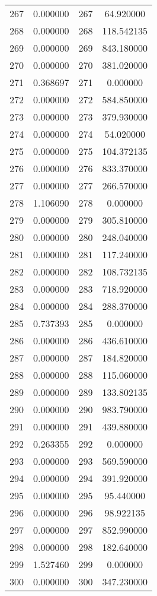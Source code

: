 \documentclass[12pt]{article}
\begin{document}
\begin{longtable}{@{}cccc@{}}
267 & 0.000000 & 267 & 64.920000 \\
268 & 0.000000 & 268 & 118.542135 \\
269 & 0.000000 & 269 & 843.180000 \\
270 & 0.000000 & 270 & 381.020000 \\
271 & 0.368697 & 271 & 0.000000 \\
272 & 0.000000 & 272 & 584.850000 \\
273 & 0.000000 & 273 & 379.930000 \\
274 & 0.000000 & 274 & 54.020000 \\
275 & 0.000000 & 275 & 104.372135 \\
276 & 0.000000 & 276 & 833.370000 \\
277 & 0.000000 & 277 & 266.570000 \\
278 & 1.106090 & 278 & 0.000000 \\
279 & 0.000000 & 279 & 305.810000 \\
280 & 0.000000 & 280 & 248.040000 \\
281 & 0.000000 & 281 & 117.240000 \\
282 & 0.000000 & 282 & 108.732135 \\
283 & 0.000000 & 283 & 718.920000 \\
284 & 0.000000 & 284 & 288.370000 \\
285 & 0.737393 & 285 & 0.000000 \\
286 & 0.000000 & 286 & 436.610000 \\
287 & 0.000000 & 287 & 184.820000 \\
288 & 0.000000 & 288 & 115.060000 \\
289 & 0.000000 & 289 & 133.802135 \\
290 & 0.000000 & 290 & 983.790000 \\
291 & 0.000000 & 291 & 439.880000 \\
292 & 0.263355 & 292 & 0.000000 \\
293 & 0.000000 & 293 & 569.590000 \\
294 & 0.000000 & 294 & 391.920000 \\
295 & 0.000000 & 295 & 95.440000 \\
296 & 0.000000 & 296 & 98.922135 \\
297 & 0.000000 & 297 & 852.990000 \\
298 & 0.000000 & 298 & 182.640000 \\
299 & 1.527460 & 299 & 0.000000 \\
300 & 0.000000 & 300 & 347.230000 \\

\end{longtable}
\end{document}
